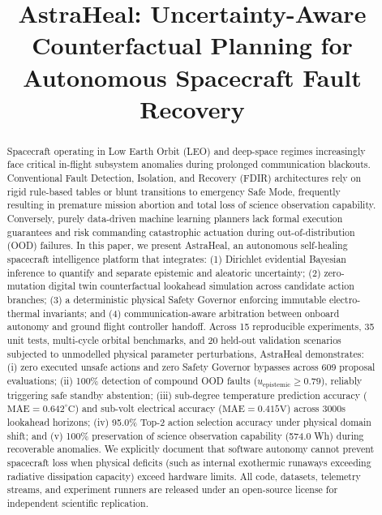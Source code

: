 \documentclass[conference]{IEEEtran}
\begin{document}
\title{AstraHeal: Uncertainty-Aware Counterfactual Planning for Autonomous Spacecraft Fault Recovery}

\author{
}

\maketitle

\begin{abstract}
Spacecraft operating in Low Earth Orbit (LEO) and deep-space regimes increasingly face critical in-flight subsystem anomalies during prolonged communication blackouts. Conventional Fault Detection, Isolation, and Recovery (FDIR) architectures rely on rigid rule-based tables or blunt transitions to emergency Safe Mode, frequently resulting in premature mission abortion and total loss of science observation capability. Conversely, purely data-driven machine learning planners lack formal execution guarantees and risk commanding catastrophic actuation during out-of-distribution (OOD) failures. In this paper, we present AstraHeal, an autonomous self-healing spacecraft intelligence platform that integrates: (1) Dirichlet evidential Bayesian inference to quantify and separate epistemic and aleatoric uncertainty; (2) zero-mutation digital twin counterfactual lookahead simulation across candidate action branches; (3) a deterministic physical Safety Governor enforcing immutable electro-thermal invariants; and (4) communication-aware arbitration between onboard autonomy and ground flight controller handoff. Across 15 reproducible experiments, 35 unit tests, multi-cycle orbital benchmarks, and 20 held-out validation scenarios subjected to unmodelled physical parameter perturbations, AstraHeal demonstrates: (i) zero executed unsafe actions and zero Safety Governor bypasses across 609 proposal evaluations; (ii) 100\% detection of compound OOD faults ($u_{\text{epistemic}} \ge 0.79$), reliably triggering safe standby abstention; (iii) sub-degree temperature prediction accuracy ($\text{MAE} = 0.642^\circ\text{C}$) and sub-volt electrical accuracy ($\text{MAE} = 0.415\text{V}$) across 3000s lookahead horizons; (iv) 95.0\% Top-2 action selection accuracy under physical domain shift; and (v) 100\% preservation of science observation capability (574.0 Wh) during recoverable anomalies. We explicitly document that software autonomy cannot prevent spacecraft loss when physical deficits (such as internal exothermic runaways exceeding radiative dissipation capacity) exceed hardware limits. All code, datasets, telemetry streams, and experiment runners are released under an open-source license for independent scientific replication.
\end{abstract}
\end{document}
